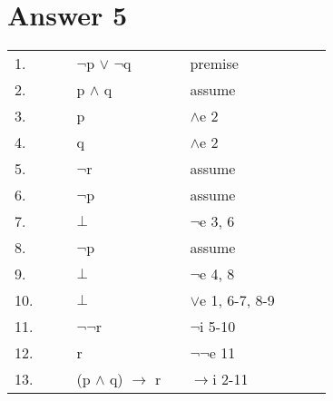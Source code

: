 \documentclass[12pt]{article}
\begin{document}
\section*{Answer 5}

\begin{table}[H]
\centering
\begin{tabular}{|lllllllll|}
\hline
1.                        &                       &                       & $\neg$p $\lor$ $\neg$q &  & premise      &          &             &  \\ \cline{2-8}
\multicolumn{1}{|l|}{2.}  &                       &                       & p $\land$ q &  & assume      &         & \multicolumn{1}{l|}{} &  \\
\multicolumn{1}{|l|}{3.}  &                       &                       & p  &  & $\land$e 2      &       & \multicolumn{1}{l|}{} &  \\
\multicolumn{1}{|l|}{4.}  &                       &                       & q &  & $\land$e 2      &         & \multicolumn{1}{l|}{} &  \\ \cline{3-7}
\multicolumn{1}{|l|}{5.}  & \multicolumn{1}{l|}{} &                       & $\neg$r &  & assume        & \multicolumn{1}{l|}{} & \multicolumn{1}{l|}{} &  \\ \cline{4-6}
\multicolumn{1}{|l|}{6.}  & \multicolumn{1}{l|}{} & \multicolumn{1}{l|}{} & $\neg$p  &  & \multicolumn{1}{l|}{assume} & \multicolumn{1}{l|}{} & \multicolumn{1}{l|}{} &  \\
\multicolumn{1}{|l|}{7.}  & \multicolumn{1}{l|}{} & \multicolumn{1}{l|}{} & $\bot$  &  & \multicolumn{1}{l|}{$\neg$e 3, 6} & \multicolumn{1}{l|}{} & \multicolumn{1}{l|}{} &  \\ \cline{4-6}
\multicolumn{1}{|l|}{8.}  & \multicolumn{1}{l|}{} & \multicolumn{1}{l|}{} & $\neg$p &  & \multicolumn{1}{l|}{assume} & \multicolumn{1}{l|}{} & \multicolumn{1}{l|}{} &  \\
\multicolumn{1}{|l|}{9.}  & \multicolumn{1}{l|}{} & \multicolumn{1}{l|}{} & $\bot$ &  & \multicolumn{1}{l|}{$\neg$e 4, 8}  & \multicolumn{1}{l|}{} & \multicolumn{1}{l|}{} &  \\ \cline{4-6}
\multicolumn{1}{|l|}{10.} & \multicolumn{1}{l|}{} &                       & $\bot$ &  & $\lor$e 1, 6-7, 8-9  & \multicolumn{1}{l|}{} & \multicolumn{1}{l|}{} &  \\ \cline{3-7}
\multicolumn{1}{|l|}{11.} &                       &                       & $\neg\neg$r &  & $\neg$i 5-10     &                       & \multicolumn{1}{l|}{} &  \\
\multicolumn{1}{|l|}{12.} &                       &                       & r &  &  $\neg\neg$e 11          &    & \multicolumn{1}{l|}{} &  \\ \cline{2-8}
13.                       &                       &                       & (p $\land$ q) $\rightarrow$ r &  &  $\rightarrow$i 2-11   &             &         &  \\ \hline
\end{tabular}
\end{table}
\end{document}
